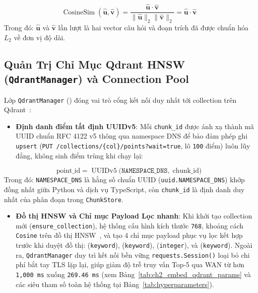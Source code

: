 \begin{equation}
  \operatorname{CosineSim}(\hat{\mathbf{u}}, \hat{\mathbf{v}}) = \frac{\hat{\mathbf{u}} \cdot \hat{\mathbf{v}}}{\|\hat{\mathbf{u}}\|_2 \|\hat{\mathbf{v}}\|_2} = \hat{\mathbf{u}} \cdot \hat{\mathbf{v}}
  \label{eq:ch2_cosine}
\end{equation}
\noindent Trong đó: $\hat{\mathbf{u}}$ và $\hat{\mathbf{v}}$ lần lượt là hai vector câu hỏi và đoạn trích đã được chuẩn hóa $L_2$ về đơn vị độ dài.

\subsection{Quản Trị Chỉ Mục Qdrant HNSW (\texttt{QdrantManager}) và Connection Pool}
\label{sec:ch2_qdrant}

Lớp \texttt{QdrantManager} () đóng vai trò cổng kết nối duy nhất tới collection  trên Qdrant~\cite{qdrant2023vector}:
\begin{itemize}
  \item \textbf{Định danh điểm tất định UUIDv5}: Mỗi \texttt{chunk\_id} được ánh xạ thành mã UUID chuẩn RFC 4122 v5 thông qua namespace DNS để bảo đảm phép ghi \texttt{upsert} (\texttt{PUT /collections/\{col\}/points?wait=true}, lô \texttt{100} điểm) luôn lũy đẳng, không sinh điểm trùng khi chạy lại:
\end{itemize}
\begin{equation}
  \text{point\_id} = \operatorname{UUIDv5}\bigl(\texttt{NAMESPACE\_DNS},\; \text{chunk\_id}\bigr)
  \label{eq:ch2_uuidv5}
\end{equation}
\noindent Trong đó: \texttt{NAMESPACE\_DNS} là hằng số chuẩn UUID (\texttt{uuid.NAMESPACE\_DNS}) khớp đồng nhất giữa Python và dịch vụ TypeScript, còn \texttt{chunk\_id} là định danh duy nhất của phân đoạn trong \texttt{ChunkStore}.

\begin{itemize}
  \item \textbf{Đồ thị HNSW và Chỉ mục Payload Lọc nhanh}: Khi khởi tạo collection mới (\texttt{ensure\_collection}), hệ thống cấu hình kích thước \texttt{768}, khoảng cách \texttt{Cosine} trên đồ thị HNSW~\cite{malkov2018efficient}, và tạo 4 chỉ mục payload phục vụ lọc kết hợp trước khi duyệt đồ thị:  (\texttt{keyword}),  (\texttt{keyword}),  (\texttt{integer}), và  (\texttt{keyword}). Ngoài ra, \texttt{QdrantManager} duy trì kết nối bền vững \texttt{requests.Session()} loại bỏ chi phí bắt tay TLS lặp lại, giúp giảm độ trễ truy vấn Top-5 qua WAN từ hơn \texttt{1,000 ms} xuống \texttt{269.46 ms} (xem Bảng~\ref{tab:ch2_embed_qdrant_params} và các siêu tham số toàn hệ thống tại Bảng~\ref{tab:hyperparameters}).
\end{itemize}

